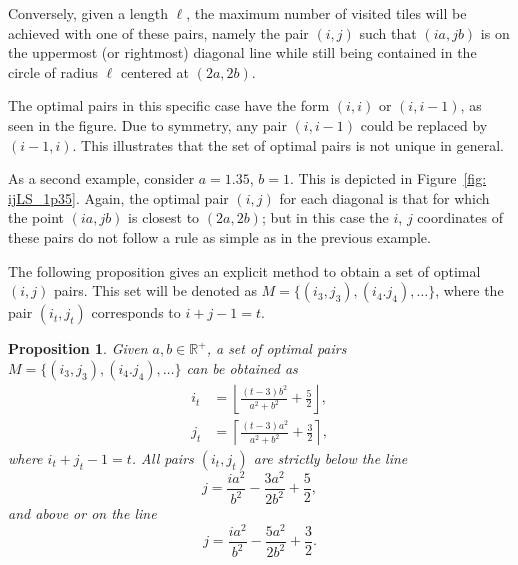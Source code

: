 \documentclass[12pt, a4paper]{article}
\newcommand{\len}{\ell} %
\newcommand{\tiles}{t} %
\newcommand{\mss}{M}
\newtheorem{proposition}{Proposition}%
\begin{document}
Conversely, given a length $\len$, the maximum number of visited tiles will be achieved with one of these pairs, namely the pair $(i,j)$ such that $(ia,jb)$ is on the uppermost (or rightmost) diagonal line while still being contained in the circle of radius $\len$ centered at $(2a,2b)$.

The optimal pairs in this specific case have the form $(i,i)$ or $(i,i-1)$, as seen in the figure. Due to symmetry, any pair $(i,i-1)$ could be replaced by $(i-1,i)$. This illustrates that the set of optimal pairs is not unique in general. 

As a second example, consider $a=1.35$, $b=1$. This is depicted in Figure~\ref{fig: ijLS_1p35}. Again, the optimal pair $(i,j)$ for each diagonal is that for which the point $(ia,jb)$ is closest to $(2a,2b)$; but in this case the $i$, $j$ coordinates of these pairs do not follow a rule as simple as in the previous example.

The following proposition gives an explicit method to obtain a set of optimal $(i,j)$ pairs. This set will be denoted as $\mss = \{(i_3,j_3), (i_4.j_4), \ldots\}$, where the pair $(i_\tiles,j_\tiles)$ corresponds to $i+j-1 = \tiles$.

\begin{proposition}
\label{prop: min suff set, form}
Given $a, b \in \mathbb R^+$, a set of optimal pairs $\mss = \{(i_3,j_3), (i_4.j_4), \ldots\}$ can be obtained as
\begin{align}
\label{eq: min suff set, form, i}
i_\tiles &= \left\lfloor \frac{(\tiles-3) b^2}{a^2+b^2} + \frac 5 2 \right\rfloor, \\
\label{eq: min suff set, form, j}
j_\tiles &= \left\lceil  \frac{(\tiles-3) a^2}{a^2+b^2} + \frac 3 2 \right\rceil,
\end{align}
where $i_\tiles + j_\tiles-1 = \tiles$. All pairs $(i_\tiles,j_\tiles)$ are strictly below the line
\begin{equation}
\label{eq: upper bound, line}
j = \frac{i a^2}{b^2} - \frac{3a^2}{2b^2} + \frac 5 2,
\end{equation}
and above or on the line
\begin{equation}
\label{eq: lower bound, line}
j = \frac{i a^2}{b^2} - \frac{5a^2}{2b^2} + \frac 3 2.
\end{equation}
\end{proposition}
\end{document}
